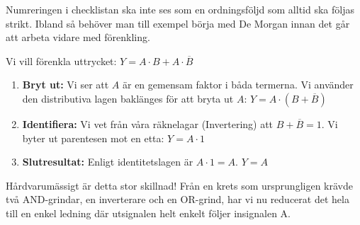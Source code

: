 \documentclass[
  swedish,
  letterpaper,
  oneside,
  openany]{book}
\begin{document}
Numreringen i checklistan ska inte ses som en ordningsföljd som alltid
ska följas strikt. Ibland så behöver man till exempel börja med De
Morgan innan det går att arbeta vidare med förenkling.

\begin{tcolorbox}[enhanced jigsaw, arc=.35mm, bottomrule=.15mm, bottomtitle=1mm, breakable, colback=white, colbacktitle=quarto-callout-note-color!10!white, colframe=quarto-callout-note-color-frame, coltitle=black, left=2mm, leftrule=.75mm, opacityback=0, opacitybacktitle=0.6, rightrule=.15mm, title=\textcolor{quarto-callout-note-color}{\faInfo}\hspace{0.5em}{Exempel: Förenkling med bryt-ut-metoden}, titlerule=0mm, toprule=.15mm, toptitle=1mm]

Vi vill förenkla uttrycket: \(Y = A \cdot B + A \cdot \overline{B}\)

\begin{enumerate}
\def\labelenumi{\arabic{enumi}.}
\item
  \textbf{Bryt ut:} Vi ser att \(A\) är en gemensam faktor i båda
  termerna. Vi använder den distributiva lagen baklänges för att bryta
  ut \(A\): \(Y = A \cdot (B + \overline{B})\)
\item
  \textbf{Identifiera:} Vi vet från våra räknelagar (Invertering) att
  \(B + \overline{B} = 1\). Vi byter ut parentesen mot en etta:
  \(Y = A \cdot 1\)
\item
  \textbf{Slutresultat:} Enligt identitetslagen är \(A \cdot 1 = A\).
  \(Y = A\)
\end{enumerate}

Hårdvarumässigt är detta stor skillnad! Från en krets som ursprungligen
krävde två AND-grindar, en inverterare och en OR-grind, har vi nu
reducerat det hela till en enkel ledning där utsignalen helt enkelt
följer insignalen A.

\end{tcolorbox}
\end{document}

